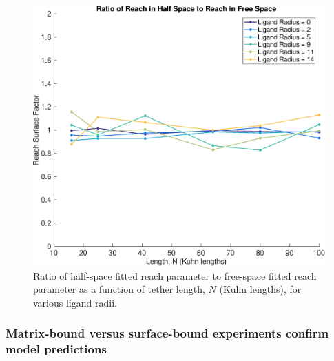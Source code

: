 \documentclass[../../AdvancementSummary.tex]{subfiles}
\begin{document}
\begin{figure}[H]
    \begin{center}
        		\includegraphics[width=0.7\linewidth]{ResultsFigures/ReachSurfaceFactor/ReachSurfaceFactor.eps}
        \caption{Ratio of half-space fitted reach parameter to free-space fitted reach parameter as a function of tether length, $N$ (Kuhn lengths), for various ligand radii. \label{fig: ReachSurfaceFactor}}
    \end{center}
\end{figure}


\subsubsection{Matrix-bound versus surface-bound experiments confirm model predictions}
\end{document}
